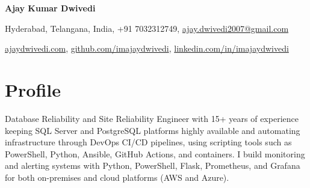 \documentclass[10pt,a4paper]{article}
\begin{document}
\begin{center}
{\Huge\bfseries Ajay Kumar Dwivedi}

\vspace{6pt}
Hyderabad, Telangana, India, +91 7032312749, \href{mailto:ajay.dwivedi2007@gmail.com}{ajay.dwivedi2007@gmail.com}

\vspace{2pt}
\href{https://ajaydwivedi.com/}{ajaydwivedi.com}, \href{https://github.com/imajaydwivedi}{github.com/imajaydwivedi}, \href{https://linkedin.com/in/imajaydwivedi/}{linkedin.com/in/imajaydwivedi}
\end{center}

\section{Profile}
Database Reliability and Site Reliability Engineer with 15+ years of experience keeping SQL Server and PostgreSQL platforms highly available and automating infrastructure through DevOps CI/CD pipelines, using scripting tools such as PowerShell, Python, Ansible, GitHub Actions, and containers. I build monitoring and alerting systems with Python, PowerShell, Flask, Prometheus, and Grafana for both on-premises and cloud platforms (AWS and Azure).
\end{document}
